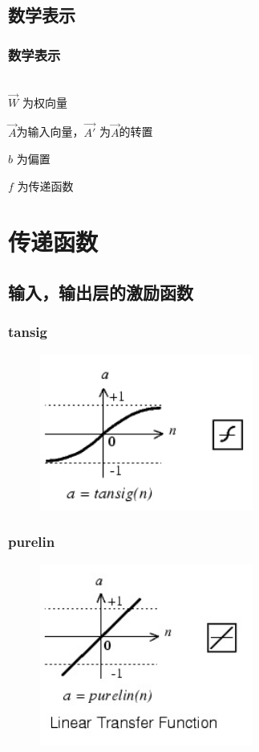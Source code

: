 \documentclass[slidestop,compress,mathserif,c]{beamer}
\begin{document}
\subsection{数学表示}
\begin{frame}
\frametitle{数学表示}
~\\[1cm]
$ \vec{W} $ 为权向量

$ \vec{A} $为输入向量，$\vec{A'} $ 为$\vec{A}$的转置

$b$ 为偏置

$f$ 为传递函数
\end{frame}
\section{传递函数}
\subsection{输入，输出层的激励函数}
\begin{frame}
\frametitle{tansig}
\begin{figure}
\centering
\includegraphics[width=7cm]{tansig_TFMATLAB}
\end{figure}

\end{frame}

\begin{frame}
\frametitle{purelin}
\begin{figure}
\centering
\includegraphics[width=7cm]{purelin}
\end{figure}
\end{frame}
\end{document}
